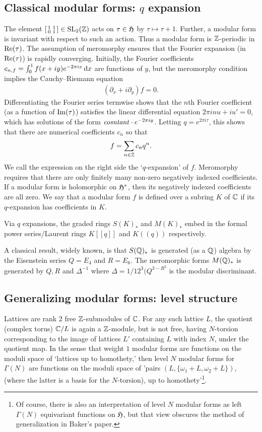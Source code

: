 \documentclass[11pt]{amsart}
\begin{document}
\subsection{Classical modular forms: $q$ expansion}
The element $\left[ \begin{smallmatrix} 1 & 1 \\ 0 & 1 \end{smallmatrix} \right] \in \operatorname{SL}_{2}(\mathbb{Z})$ acts on $\tau \in \mathfrak{H}$ by $\tau \mapsto \tau+1$. Further, a modular form is invariant with respect to such an action. Thus a modular form is $\mathbb{Z}$-periodic in $\operatorname{Re}(\tau)$. The assumption of meromorphy ensures that the Fourier expansion (in $\operatorname{Re}(\tau)$) is rapidly converging. Initially, the Fourier coefficients $c_{n,f}=\int_{0}^{1}f(x+iy)e^{-2\pi i x} \,{\rm d} x$ are functions of $y$, but the meromorphy condition implies the Cauchy--Riemann equation 
	\begin{align*}
		(\partial_{x}+i\partial_{y})f=0.
	\end{align*}
Differentiating the Fourier series termwise shows that the $n$th Fourier coefficient (as a function of $\operatorname{Im}(\tau)$) satisfies the linear differential equation $2\pi i n u+iu'=0$, which has solutions of the form $\text{\emph{cosntant}}\cdot e^{-2\pi i y}$. Letting $q=e^{2\pi i \tau}$, this shows that there are numerical coefficients $c_{n}$ so that
	\begin{align*}
		f=\sum_{n\in \mathbb{Z}}c_{n}q^{n}.
	\end{align*}
We call the expression on the right side the `$q$-expansion' of $f$. Meromorphy requires that there are only finitely many non-zero negatively indexed coefficients. If a modular form is holomorphic on $\mathfrak{H}^{*}$, then its negatively indexed coefficients are all zero. We say that a modular form $f$ is defined over a subring $K$ of $\mathbb{C}$ if its $q$-expansion has coefficients in $K$.

Via $q$ expansions, the graded rings $S(K)_{*}$ and $M(K)_{*}$ embed in the formal power series/Laurent rings $K[[q]]$ and $K((q))$ respectively.

A classical result, widely known, is that $S(\mathbb{Q})_{*}$ is generated (as a $\mathbb{Q}$) algebra by the Eisenstein series $Q=E_{4}$ and $R=E_{6}$. The meromorphic forms $M(\mathbb{Q})_{*}$ is generated by $Q,R$ and $\Delta^{-1}$ where $\Delta =1/12^{3}(Q^{3-R^{2}}$ is the modular discriminant.
 
\subsection{Generalizing modular forms: level structure}
Lattices are rank $2$ free $\mathbb{Z}$-submodules of $\mathbb{C}$. For any such lattice $L$, the quotient (complex torus)  $\mathbb{C}/L$ is again a $\mathbb{Z}$-module, but is not free, having $N$-torsion corresponding to the image of lattices $L'$ containing $L$ with index $N$, under the quotient map. In the sense that weight $1$ modular forms are functions on the moduli space of `lattices up to homothety,'  then level $N$ modular forms for $\Gamma(N)$  are functions on the moduli space of 'pairs $(L,\{\omega_{1}+L,\omega_{2}+L\})$, (where the latter is a basis for the $N$-torsion), up to homothety'\footnote{Of course, there is also an interpretation of level $N$ modular forms as left $\Gamma(N)$ equivariant functions on $\mathfrak{H}$, but that view obscures the method of generalization in Baker's paper.}.
\end{document}
